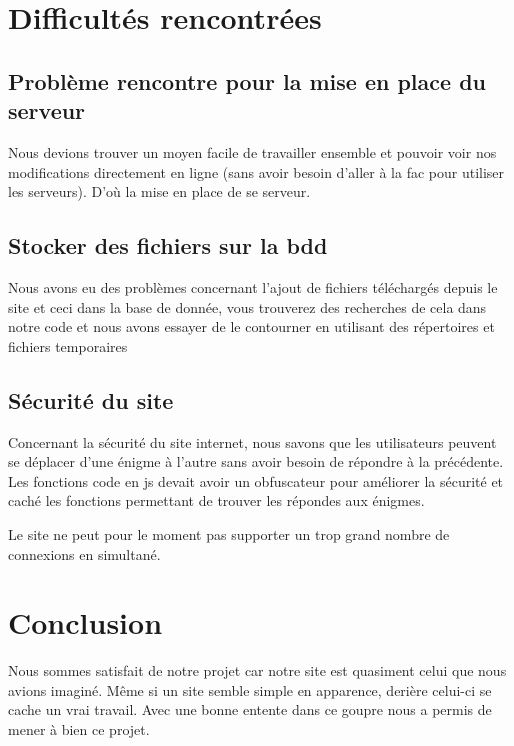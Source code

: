 \documentclass[a4paper, 11pt]{article}
\begin{document}
\section{Difficultés rencontrées}
\subsection{Problème rencontre pour la mise en place du serveur}
Nous devions trouver un moyen facile de travailler ensemble et pouvoir  voir nos modifications directement en ligne (sans avoir besoin d'aller à la fac pour utiliser les serveurs). D'où la mise en place de se serveur.
\subsection{Stocker des fichiers sur la bdd}
Nous avons eu des problèmes concernant l'ajout de fichiers téléchargés depuis le site et ceci dans la base de donnée, vous trouverez des recherches de cela dans notre code et nous avons essayer de le contourner en utilisant des répertoires et fichiers  temporaires
\subsection{Sécurité du site}
Concernant la sécurité du site internet, nous savons que les utilisateurs peuvent se déplacer d'une énigme à l'autre sans avoir besoin de répondre à la précédente. Les fonctions code en js devait avoir un obfuscateur pour améliorer  la sécurité et caché les fonctions permettant de trouver les répondes aux énigmes.

Le site ne peut pour le moment pas supporter un trop grand nombre de connexions en simultané.

\section{Conclusion}
Nous sommes satisfait de notre projet car notre site est quasiment
celui que nous avions imaginé. Même si un site semble simple en apparence,
derière celui-ci se cache un vrai travail. Avec une bonne entente dans
ce goupre nous a permis de mener à bien ce projet.
\end{document}
